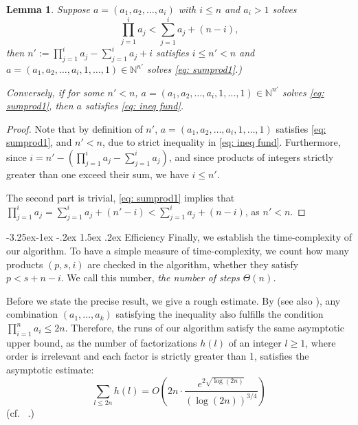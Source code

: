 \documentclass[10pt]{article}
\makeatletter
\renewcommand\subsection{\@startsection{subsection}{2}{\z@}
  {-3.25ex\@plus -1ex \@minus -.2ex}
  {1.5ex \@plus .2ex}
  {\normalfont\normalsize\bfseries\boldmath}}
\newtheorem{lemma}{Lemma}
\theoremstyle{definition}
\theoremstyle{remark}
\numberwithin{equation}{section}
\makeatother
\begin{document}
\begin{lemma}\label{lem: nyblom}
Suppose $a=(a_1,a_2,\dots,a_i)$ with $i\leq n$ and $a_i>1$ solves
\begin{equation}\label{eq: ineq fund}
\prod_{j=1}^i a_j<\sum_{j=1}^i a_j+(n-i),
\end{equation}
then $n':=\prod_{j=1}^i a_j-\sum_{j=1}^i a_j+i$ satisfies $i\leq n'<n$ and  $a=(a_1,a_2,\dots,a_i,1,\dots,1)\in\mathbb N^{n'}$ solves \eqref{eq: sumprod1}.)

Conversely, if for some $n'<n$, $a=(a_1,a_2,\dots,a_i,1,\dots,1)\in\mathbb N^{n'}$ solves \eqref{eq: sumprod1}, then $a$ satisfies \eqref{eq: ineq fund}.
\end{lemma}
\begin{proof}
Note that by definition of $n'$, $a=(a_1,a_2,\dots,a_i,1,\dots,1)$ satisfies \eqref{eq: sumprod1}, and $n'<n$, due to strict inequality in \eqref{eq: ineq fund}.  Furthermore, since $i=n'-(\prod_{j=1}^i a_j-\sum_{j=1}^i a_j)$, and since products of integers strictly greater than one exceed their sum, we have $i\leq n'$.

The second part is trivial, \eqref{eq: sumprod1} implies that $\prod_{j=1}^i a_j=\sum_{j=1}^i a_j+(n'-i)<\sum_{j=1}^i a_j+(n-i)$,
as $n'<n$.
\end{proof}

\subsection{Efficiency}
Finally, we establish the time-complexity of our algorithm. To have a simple measure of time-complexity, we count how many products
$(p,s,i)$ are checked in the algorithm, whether they satisfy $p<s+n-i$. We call this number, {\it the number of steps $\Theta(n)$.} 

Before we state the precise result, we give a rough estimate. By \cite[Boundedness proposition 1]{ecker} (see also \cite[Lemma 6.3]{weingartner}), any combination \( (a_1, \dots, a_k) \) satisfying the inequality also fulfills the condition \( \prod_{i=1}^n a_i \leq 2n \). Therefore, the runs of our algorithm satisfy the same asymptotic upper bound, as the number of factorizations \( h(l) \) of an integer \( l \geq 1 \), where order is irrelevant and each factor is strictly greater than 1, satisfies the asymptotic estimate:
\begin{equation}\label{eq: opp}
\sum_{l \leq 2n} h(l) = O\left( 2n \cdot \frac{e^{2\sqrt{\log(2n)}}}{(\log(2n))^{3/4}} \right)
\end{equation}
(cf.~ \cite[Eq (4.51)]{oppenheim1927}.)
\end{document}
